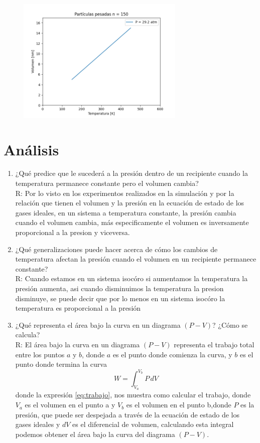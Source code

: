 \documentclass[a4paper, 12p]{article}
\begin{document}
\begin{figure}[H]
	\raggedright
	\includegraphics[width=8cm, height=6cm]{graficos/grafico9.pdf}
\end{figure}


\section{Análisis}
\begin{enumerate}
      \item ¿Qué predice que le sucederá a la presión dentro de un recipiente cuando la temperatura permanece constante pero el volumen cambia?\\
             R: Por lo visto en los experimentos realizados en la simulación y por la relación que tienen el volumen y la presión en la ecuación de estado de los gases ideales, en un sistema a temperatura constante, la presión cambia cuando el volumen cambia, más especificamente el volumen es inversamente proporcional a la presion y viceversa.\\   
       \item ¿Qué generalizaciones puede hacer acerca de cómo los cambios de temperatura afectan la presión cuando el volumen en un recipiente permanece constante?\\
             R: Cuando estamos en un sistema isocóro si aumentamos la temperatura la presión aumenta, asi cuando disminuimos la temperatura la presion disminuye, se puede decir que por lo menos en un sistema isocóro la temperatura es proporcional a la presión\\ 
      \item ¿Qué representa el área bajo la curva en un diagrama $(P-V)$? ¿Cómo se calcula?\\
             R: El área bajo la curva en un diagrama $(P-V)$ representa el trabajo total entre los puntos $a$ y $b$, donde $a$ es el punto donde comienza la curva, y $b$ es el punto donde termina la curva
             \begin{equation}\label{eq:trabajo}
             W = \int_{V_a}^{V_b} \! P \, dV 
             \end{equation}
             donde la expresión \ref{eq:trabajo}, nos muestra como calcular el trabajo, donde $V_a$ es el volumen en el punto a y $V_b$ es el volumen en el punto b,donde $P$ es la presión, que puede ser despejada a través de la ecuación de estado de los gases ideales y $dV$ es el diferencial de volumen, calculando esta integral podemos obtener el área bajo la curva del diagrama $(P-V)$.\\ 
\end{enumerate}
\end{document}
